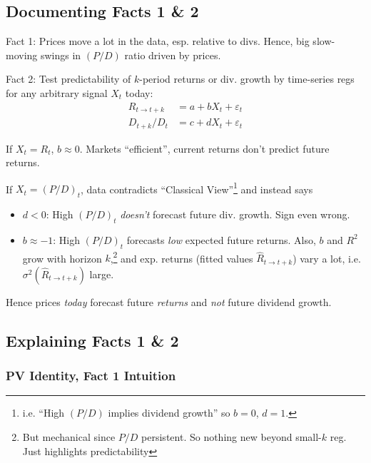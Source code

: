 \documentclass[12pt]{article}
\theoremstyle{plain}
\theoremstyle{definition}
\theoremstyle{remark}
\newcommand{\ra}{\rightarrow}
\begin{document}
\begin{multicols*}{2}
\subsection{Documenting Facts 1 \& 2}
\label{sec:predictability}

Fact 1: Prices move a lot in the data, esp. relative to divs.
Hence, big slow-moving swings in $(P/D)$ ratio driven by prices.

Fact 2:
Test predictability of $k$-period returns or div. growth by
time-series regs for any arbitrary signal $X_t$ today:
\begin{align*}
  R_{t\ra t+k} &= a + bX_t + \varepsilon_t \\
  D_{t+k}/D_t &= c + dX_t + \varepsilon_t
\end{align*}

If $X_t=R_t$, $b\approx 0$.
Markets ``efficient'', current returns don't predict future returns.

If $X_t=(P/D)_t$,
data contradicts ``Classical View''\footnote{%
  i.e. ``High $(P/D)$ implies dividend growth'' so $b=0$, $d=1$.
}
and instead says
\begin{itemize}
  \item
    $d<0$: High $(P/D)_t$ \emph{doesn't} forecast future div. growth.
    Sign even wrong.
  \item
    $b\approx -1$:
    High $(P/D)_t$ forecasts \emph{low} expected future returns.
    Also, $b$ and $R^2$ grow with horizon $k$,\footnote{%
      But mechanical since $P/D$ persistent.
      So nothing new beyond small-$k$ reg.
      Just highlights predictability
    }
    and exp. returns (fitted values $\hat{R}_{t\ra t+k}$) vary a
    lot, i.e.  $\sigma^2(\hat{R}_{t\ra t+k})$ large.
\end{itemize}
Hence prices \emph{today} forecast future \emph{returns} and \emph{not}
future dividend growth.


\columnbreak
\subsection{Explaining Facts 1 \& 2}

\subsubsection{PV Identity, Fact 1 Intuition}


\end{multicols*}
\end{document}

